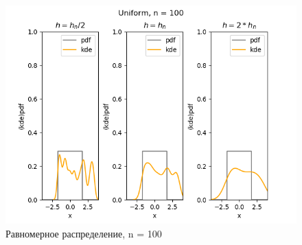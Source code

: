 \documentclass[../body.tex]{subfiles}
\begin{document}
\begin{figure}[H]
	\centering
	\includegraphics[width=\textwidth, height =0.4\textheight]{img/UniformKDE n = 100.png}
	\caption{Равномерное распределение, n = 100}
	\label{fig:uniform_kde_100}
\end{figure}
\end{document}
